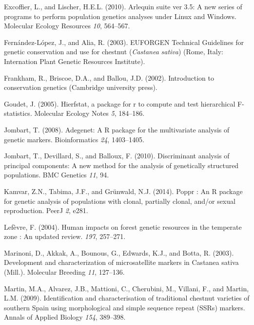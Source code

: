 \documentclass[12pt,a4paper,]{report}
\begin{document}
\leavevmode\hypertarget{ref-excoffier_arlequin_2010}{}%
Excoffier, L., and Lischer, H.E.L. (2010). Arlequin suite ver 3.5: A new
series of programs to perform population genetics analyses under Linux
and Windows. Molecular Ecology Resources \emph{10}, 564--567.

\leavevmode\hypertarget{ref-fernandez-lopez_euforgen_2003}{}%
Fernández-López, J., and Alia, R. (2003). EUFORGEN Technical Guidelines
for genetic conservation and use for chestnut (\emph{Castanea}
\emph{sativa}) (Rome, Italy: Internation Plant Genetic Resources
Institute).

\leavevmode\hypertarget{ref-frankham_introduction_2002}{}%
Frankham, R., Briscoe, D.A., and Ballou, J.D. (2002). Introduction to
conservation genetics (Cambridge university press).

\leavevmode\hypertarget{ref-goudet_hierfstat_2005}{}%
Goudet, J. (2005). Hierfstat, a package for r to compute and test
hierarchical F-statistics. Molecular Ecology Notes \emph{5}, 184--186.

\leavevmode\hypertarget{ref-Jombart2008}{}%
Jombart, T. (2008). Adegenet: A R package for the multivariate analysis
of genetic markers. Bioinformatics \emph{24}, 1403--1405.

\leavevmode\hypertarget{ref-Jombart2010}{}%
Jombart, T., Devillard, S., and Balloux, F. (2010). Discriminant
analysis of principal components: A new method for the analysis of
genetically structured populations. BMC Genetics \emph{11}, 94.

\leavevmode\hypertarget{ref-Kamvar2014}{}%
Kamvar, Z.N., Tabima, J.F., and Grünwald, N.J. (2014). Poppr : An R
package for genetic analysis of populations with clonal, partially
clonal, and/or sexual reproduction. PeerJ \emph{2}, e281.

\leavevmode\hypertarget{ref-Lefevre2004}{}%
Lefèvre, F. (2004). Human impacts on forest genetic resources in the
temperate zone : An updated review. \emph{197}, 257--271.

\leavevmode\hypertarget{ref-marinoni_development_2003}{}%
Marinoni, D., Akkak, A., Bounous, G., Edwards, K.J., and Botta, R.
(2003). Development and characterization of microsatellite markers in
Castanea sativa (Mill.). Molecular Breeding \emph{11}, 127--136.

\leavevmode\hypertarget{ref-martin_identification_2009}{}%
Martin, M.A., Alvarez, J.B., Mattioni, C., Cherubini, M., Villani, F.,
and Martin, L.M. (2009). Identification and characterisation of
traditional chestnut varieties of southern Spain using morphological and
simple sequence repeat (SSRs) markers. Annals of Applied Biology
\emph{154}, 389--398.
\end{document}
